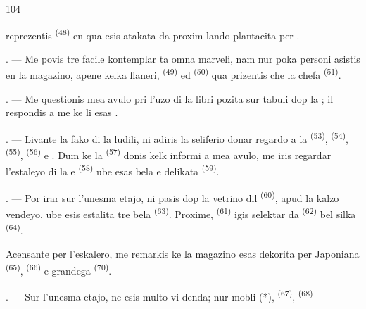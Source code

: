\begin{VUpage}[106]{104}

\VUcontinue
reprezentis  \textsuperscript{(48)} en qua \nl
esis atakata da  proxim lando plantacita\nl
per .

. --- Me povis tre facile kontemplar ta omna\nl
marveli, nam nur poka personi asistis en la\nl
magazino, apene kelka flaneri,  \textsuperscript{(49)} ed\nl
{} \textsuperscript{(50)} qua prizentis  che la chefa\nl
{} \textsuperscript{(51)}.

. --- Me questionis mea avulo pri l'uzo di\nl
la libri pozita sur tabuli dop la  ; il\nl
respondis a me ke li esas .

\VUsaut{3.6mm}
\VUsaut{2.8mm}

. --- Livante la fako di la ludili, ni adiris\nl
la seliferio donar regardo a la  \textsuperscript{(53)}, \cc
{} \textsuperscript{(54)},  \textsuperscript{(55)},  \textsuperscript{(56)} e . Dum ke\nl
la  \textsuperscript{(57)} donis kelk informi a mea avulo,\nl
me iris regardar l'estaleyo di la  e\nl
{} \textsuperscript{(58)} ube esas bela  e delikata\nl
{} \textsuperscript{(59)}.

. --- Por irar sur l'unesma etajo, ni pasis\nl
dop la vetrino dil  \textsuperscript{(60)}, apud la kalzo\cc
vendeyo, ube esis estalita tre bela  \textsuperscript{(63)}.\nl
Proxime,  \textsuperscript{(61)} igis selektar da \cc
{} \textsuperscript{(62)} bel silka  \textsuperscript{(64)}.

\VUblancAlinea
Acensante per l'eskalero, me remarkis ke\nl
la magazino esas dekorita per Japoniana \cc
{} \textsuperscript{(65)},  \textsuperscript{(66)} e grandega  \textsuperscript{(70)}.

 . --- Sur l'unesma etajo, ne esis multo vi\cc
denda; nur mobli (*),  \textsuperscript{(67)},  \textsuperscript{(68)}
\parplein
\end{VUpage}

